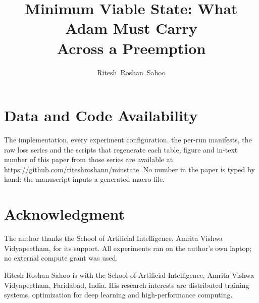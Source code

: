 \documentclass[10pt,journal,compsoc]{IEEEtran}
\newif\ifappendix\appendixfalse
\begin{document}
\title{Minimum Viable State: What Adam Must Carry\\Across a Preemption}

\author{Ritesh~Roshan~Sahoo%
}



\maketitle
\IEEEdisplaynontitleabstractindextext
\IEEEpeerreviewmaketitle












\section*{Data and Code Availability}
The implementation, every experiment configuration, the per-run manifests, the raw loss series and the scripts that
regenerate each table, figure and in-text number of this paper from those series are available at
\url{https://github.com/riteshroshann/minstate}. No number in the paper is typed by hand: the manuscript inputs a
generated macro file.

\section*{Acknowledgment}
The author thanks the School of Artificial Intelligence, Amrita Vishwa Vidyapeetham, for its support. All experiments ran
on the author's own laptop; no external compute grant was used.




\begin{IEEEbiographynophoto}{Ritesh Roshan Sahoo}
is with the School of Artificial Intelligence, Amrita Vishwa Vidyapeetham, Faridabad, India. His research
interests are distributed training systems, optimization for deep learning and high-performance computing.
\end{IEEEbiographynophoto}

\ifappendix
\onecolumn
\appendices

\fi
\end{document}
